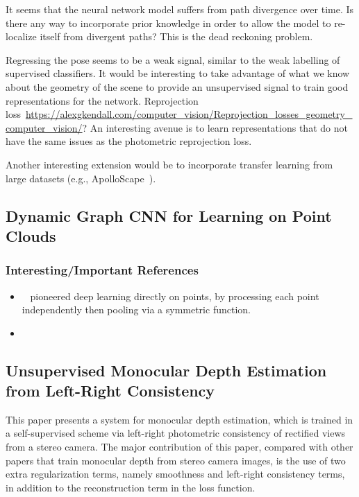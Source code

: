\documentclass[a4paper, 12pt]{article}
\begin{document}
It seems that the neural network model suffers from path divergence over time.
Is there any way to incorporate prior knowledge in order to allow the model to
re-localize itself from divergent paths? This is the dead reckoning problem.

Regressing the pose seems to be a weak signal, similar to the weak labelling of
supervised classifiers. It would be interesting to take advantage of what we
know about the geometry of the scene to provide an unsupervised signal to train
good representations for the network. Reprojection
loss~\url{https://alexgkendall.com/computer_vision/Reprojection_losses_geometry_computer_vision/}?
An interesting avenue is to learn representations that do not have the same
issues as the photometric reprojection loss.

Another interesting extension would be to incorporate transfer learning from
large datasets (e.g., ApolloScape~\citet{huang-apolloscape-2018}).


\subsection{Dynamic Graph CNN for Learning on Point
            Clouds~\cite{dgcnn2018wang}}


\subsubsection{Interesting/Important References}

\begin{itemize}
        \item~\cite{qi2016pointnet} pioneered deep learning directly on points,
                by processing each point independently then pooling via a
                symmetric function.

        \item~\cite{bruna2013dynamic}
\end{itemize}


\subsection{Unsupervised Monocular Depth Estimation from Left-Right
            Consistency~\citet{monodepth17}}

This paper presents a system for monocular depth estimation, which is trained
in a self-supervised scheme via left-right photometric consistency of rectified
views from a stereo camera. The major contribution of this paper, compared with
other papers that train monocular depth from stereo camera images, is the use
of two extra regularization terms, namely smoothness and left-right consistency
terms, in addition to the reconstruction term in the loss function.
\end{document}
